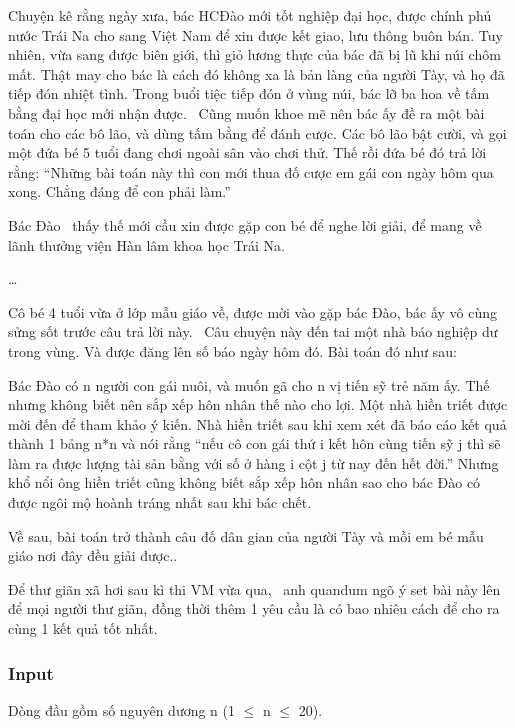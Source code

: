 



   Chuyện kê rằng ngày xưa, bác HCĐào mới tốt nghiệp đại học, được chính phủ nước Trái Na cho sang Việt Nam để xin được kết giao, lưu thông buôn bán. Tuy nhiên, vừa sang được biên giới, thì giỏ lương thực của bác đã bị lũ khi núi chôm mất. Thật may cho bác là cách đó không xa là bản làng của người Tày, và họ đã tiếp đón nhiệt tình. Trong buổi tiệc tiếp đón ở vùng núi, bác lỡ ba hoa về tấm bằng đại học mới nhận được.  Cũng muốn khoe mẽ nên bác ấy đề ra một bài toán cho các bô lão, và dùng tấm bằng để đánh cược. Các bô lão bật cười, và gọi một đứa bé 5 tuổi đang chơi ngoài sân vào chơi thử. Thế rồi đứa bé đó trả lời rằng: “Những bài toán này thì con mới thua đố cược em gái con ngày hôm qua xong. Chẳng đáng để con phải làm.”  

   Bác Đào  thấy thế mới cầu xin được gặp con bé để nghe lời giải, để mang về lãnh thưởng viện Hàn lâm khoa học Trái Na.  

   …  

   Cô bé 4 tuổi vừa ở lớp mẫu giáo về, được mời vào gặp bác Đào, bác ấy vô cùng sửng sốt trước câu trả lời này.  Câu chuyện này đến tai một nhà báo nghiệp dư trong vùng. Và được đăng lên số báo ngày hôm đó. Bài toán đó như sau:  

   Bác Đào có n người con gái nuôi, và muốn gã cho n vị tiến sỹ trẻ năm ấy. Thế nhưng không biết nên sắp xếp hôn nhân thế nào cho lợi. Một nhà hiền triết được mời đến để tham khảo ý kiến. Nhà hiền triết sau khi xem xét đã báo cáo kết quả thành 1 bảng n*n và nói rằng “nếu cô con gái thứ i kết hôn cùng tiến sỹ j thì sẽ làm ra được lượng tài sản bằng với số ở hàng i cột j từ nay đến hết đời.” Nhưng khổ nổi ông hiền triết cũng không biết sắp xếp hôn nhân sao cho bác Đào có được ngôi mộ hoành tráng nhất sau khi bác chết.  



   Về sau, bài toán trở thành câu đố dân gian của người Tày và mỗi em bé mẫu giáo nơi đây đều giải được..  



   Để thư giãn xã hơi sau kì thi VM vừa qua,  anh quandum ngõ ý set bài này lên để mọi người thư giãn, đồng thời thêm 1 yêu cầu là có bao nhiêu cách để cho ra cùng 1 kết quả tốt nhất.  

\subsubsection{   Input  }

   Dòng đầu gồm số nguyên dương n (1  $\le$  n  $\le$  20).  

